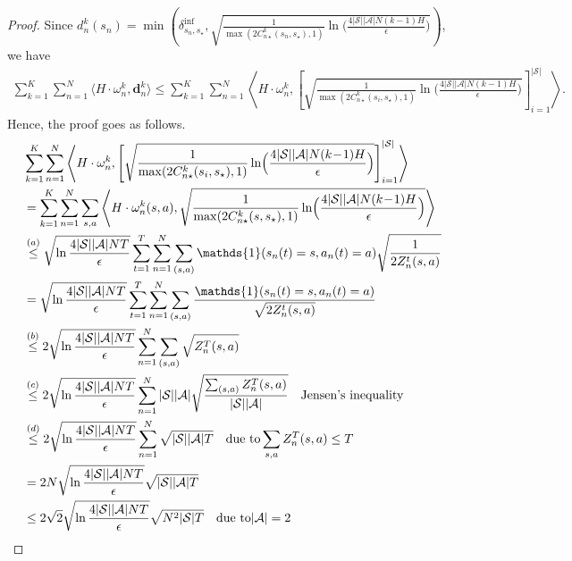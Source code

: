 \documentclass{article} %
\newcommand{\cA}{\mathcal{A}}
\newcommand{\cS}{\mathcal{S}}
\begin{document}
{\begin{proof}
Since $d_n^k(s_n) = \min\left(\delta^{\text{inf}}_{s_n, s_{\star}},\sqrt{\frac{1}{\max(2C_{n\star}^k(s_n, s_\star),1)}\ln\!\Big(\frac{4|\cS||\cA|N(k\!-\!1)H}{\epsilon}\Big)}\right)$, we have 
\begin{align}
    \sum_{k=1}^K\sum_{n=1}^N\langle  H\cdot\omega_n^k, \mathbf{d}_n^k \rangle\leq \sum_{k=1}^K\sum_{n=1}^N\left\langle  H\cdot\omega_n^k, \left[\sqrt{\frac{1}{\max(2C_{n\star}^k(s_i, s_\star),1)}\ln\!\Big(\frac{4|\cS||\cA|N(k\!-\!1)H}{\epsilon}\Big)} \right]_{i=1}^{|\cS|}\right\rangle.
\end{align}
Hence, the proof goes as follows.
\begin{align}
&\sum_{k=1}^K\sum_{n=1}^N\left\langle  H\cdot\omega_n^k, \left[\sqrt{\frac{1}{\max(2C_{n\star}^k(s_i, s_\star),1)}\ln\!\Big(\frac{4|\cS||\cA|N(k\!-\!1)H}{\epsilon}\Big)} \right]_{i=1}^{|\cS|}\right\rangle\nonumber\allowdisplaybreaks\\
&=\sum_{k=1}^K\sum_{n=1}^N\sum_{s,a}\left\langle  H\cdot\omega_n^k(s,a), \sqrt{\frac{1}{\max(2C_{n\star}^k(s, s_\star),1)}\ln\!\Big(\frac{4|\cS||\cA|N(k\!-\!1)H}{\epsilon}\Big)} \right\rangle\nonumber\allowdisplaybreaks\\
 &\overset{(a)}{\leq} \sqrt{\ln\frac{4|\cS||\cA|NT}{\epsilon}}\sum_{t=1}^{T}\sum_{n=1}^N\sum_{(s,a)}\mathds{1}(s_n(t)=s,a_n(t)= a) \sqrt{\frac{1}{2Z_n^{t}(s,a)}}\nonumber\allowdisplaybreaks\\
   &= \sqrt{\ln\frac{4|\cS||\cA|NT}{\epsilon}}\sum_{t=1}^{T}\sum_{n=1}^N\sum_{(s,a)}\frac{\mathds{1}(s_n(t)=s,a_n(t)= a)}{ \sqrt{{2Z_n^{t}(s,a)}}}\nonumber\allowdisplaybreaks\\
  &\overset{(b)}{\leq}  2\sqrt{\ln\frac{4|\cS||\cA|NT}{\epsilon}}\sum_{n=1}^N\sum_{(s,a)}{ \sqrt{{Z_n^{T}(s,a)}}}\nonumber\allowdisplaybreaks\\
  &\overset{(c)}{\leq}  2\sqrt{\ln\frac{4|\cS||\cA|NT}{\epsilon}}\sum_{n=1}^N{ |\cS||\cA|\sqrt{\frac{\sum_{(s,a)}{Z_n^{T}(s,a)}}{|\cS||\cA|}}}~~~\text{Jensen's inequality}\nonumber\allowdisplaybreaks\\
  &\overset{(d)}{\leq}  2\sqrt{\ln\frac{4|\cS||\cA|NT}{\epsilon}}\sum_{n=1}^N{ \sqrt{{|\cS||\cA|}T}}~~~\text{due to} \sum_{s,a}Z_n^T(s,a)\leq T\nonumber\allowdisplaybreaks\\
  &=  2N\sqrt{\ln\frac{4|\cS||\cA|NT}{\epsilon}}{ \sqrt{{|\cS||\cA|}T}}\nonumber\allowdisplaybreaks\\
  &\leq  2\sqrt{2}\sqrt{\ln\frac{4|\cS||\cA|NT}{\epsilon}}{ \sqrt{N^2{|\cS|}T}}~~~\text{due to} |\cA|=2\allowdisplaybreaks \label{eq:50}

\end{align}
\end{proof}}
\end{document}
